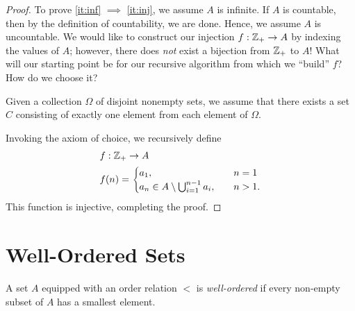 \begin{proof}
	To prove \cref{it:inf} $\implies$ \cref{it:inj}, we assume $A$ is infinite.
	If $A$ is countable, then by the definition of countability, we are done.
	Hence, we assume $A$ is uncountable. We would like to construct our injection
	$f: \mathbb{Z}_{+} \to A$ by indexing the values of $A$; however, there does
	\emph{not} exist a bijection from $\mathbb{Z}_{+}$ to $A$! What will our starting
	point be for our recursive algorithm from which we ``build'' $f$? How do we
	choose it?
	\begin{remark}
		Given a collection $\Omega$ of disjoint nonempty sets, we assume that there exists a set $C$ consisting of exactly one element from each element of $\Omega$.	
	\end{remark} Invoking the axiom of choice, we recursively define
	\begin{equation*}
		\begin{split}
			& f: \mathbb{Z}_{+} \to A \\
			& f(n) = \begin{cases}
				a_{1}, & \quad n = 1 \\
				a_{n} \in A \setminus
			\bigcup_{i=1}^{n-1} a_{i}, & \quad n > 1.\end{cases}
		\end{split}
	\end{equation*}
	This function is injective, completing the proof.
\end{proof}
\section{Well-Ordered Sets}
\begin{definition}
	A set $A$ equipped with an order relation $<$ is \emph{well-ordered}
	if every non-empty subset of $A$ has a smallest element.
\label{def:well-ordered}
\end{definition} 

